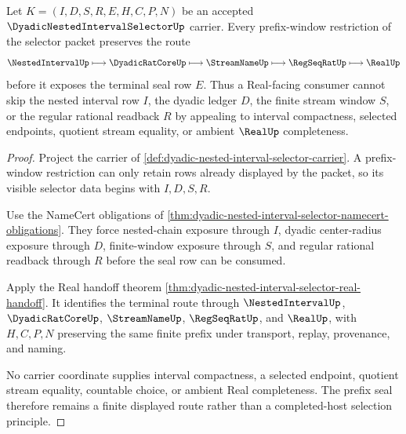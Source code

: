 \begin{theorem}
\label{thm:dyadic-nested-interval-selector-prefix-seal}
Let $K=(I,D,S,R,E,H,C,P,N)$ be an accepted $\DyadicNestedIntervalSelectorUp$ carrier. Every prefix-window restriction of the selector packet preserves the route
$$
\NestedIntervalUp \longmapsto \DyadicRatCoreUp \longmapsto \StreamNameUp \longmapsto \RegSeqRatUp \longmapsto \RealUp
$$
before it exposes the terminal seal row $E$. Thus a Real-facing consumer cannot skip the nested interval row $I$, the dyadic ledger $D$, the finite stream window $S$, or the regular rational readback $R$ by appealing to interval compactness, selected endpoints, quotient stream equality, or ambient $\RealUp$ completeness.
\end{theorem}
\begin{proof}
Project the carrier of \autoref{def:dyadic-nested-interval-selector-carrier}. A prefix-window restriction can only retain rows already displayed by the packet, so its visible selector data begins with $I,D,S,R$.

Use the NameCert obligations of \autoref{thm:dyadic-nested-interval-selector-namecert-obligations}. They force nested-chain exposure through $I$, dyadic center-radius exposure through $D$, finite-window exposure through $S$, and regular rational readback through $R$ before the seal row can be consumed.

Apply the Real handoff theorem \autoref{thm:dyadic-nested-interval-selector-real-handoff}. It identifies the terminal route through $\NestedIntervalUp$, $\DyadicRatCoreUp$, $\StreamNameUp$, $\RegSeqRatUp$, and $\RealUp$, with $H,C,P,N$ preserving the same finite prefix under transport, replay, provenance, and naming.

No carrier coordinate supplies interval compactness, a selected endpoint, quotient stream equality, countable choice, or ambient Real completeness. The prefix seal therefore remains a finite displayed route rather than a completed-host selection principle.
\end{proof}

